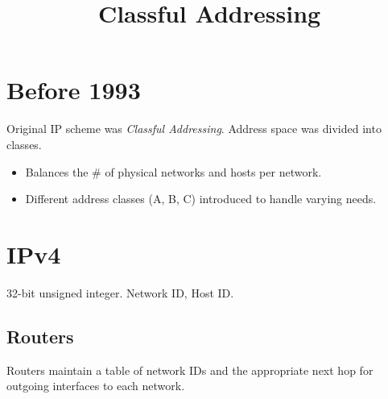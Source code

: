 \documentclass{article}
\title{Classful Addressing}
\begin{document}
\maketitle

\section*{Before 1993}
Original IP scheme was \emph{Classful Addressing}. Address space was divided into classes.
\begin{itemize}
    \item Balances the \# of physical networks and hosts per network.
    \item Different address classes (A, B, C) introduced to handle varying needs.
\end{itemize}

\section*{IPv4}
32-bit unsigned integer.
Network ID, Host ID.

\subsection*{Routers}
Routers maintain a table of network IDs and the appropriate next hop for
outgoing interfaces to each network.
\end{document}
